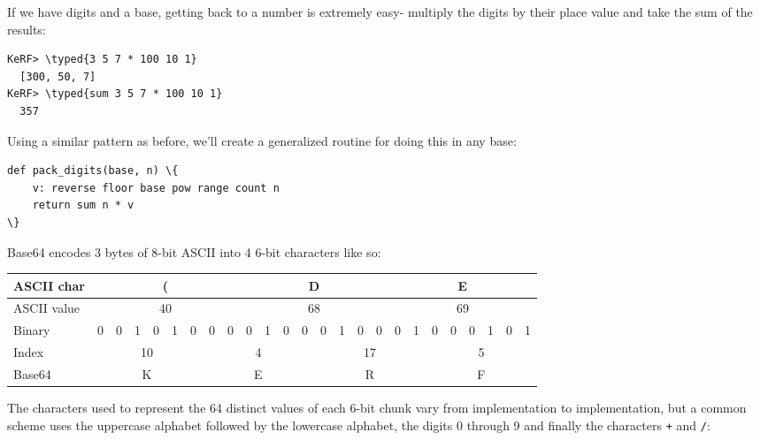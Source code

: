 \documentclass{article}
\newcommand{\typed}[1]{\textcolor{TealBlue}{#1}}
\begin{document}

If we have digits and a base, getting back to a number is extremely easy- multiply the digits by their place value and take the sum of the results:
\begin{Verbatim}
KeRF> \typed{3 5 7 * 100 10 1}
  [300, 50, 7]
KeRF> \typed{sum 3 5 7 * 100 10 1}
  357
\end{Verbatim}

Using a similar pattern as before, we'll create a generalized routine for doing this in any base:
\begin{Verbatim}
def pack_digits(base, n) \{
	v: reverse floor base pow range count n
	return sum n * v
\}
\end{Verbatim}

\pagebreak

Base64 encodes 3 bytes of 8-bit ASCII into 4 6-bit characters like so:
\begin{table}[h]
	\centering
	\begin{tabular}{| l |c|c|c|c|c|c|c|c|c|c|c|c|c|c|c|c|c|c|c|c|c|c|c|c|}
		\hline
			\cellcolor{tableHeaderColor} ASCII char &
			\multicolumn{8}{c|}{(} &
			\multicolumn{8}{c|}{D} &
			\multicolumn{8}{c|}{E} \\
		\hline
			\cellcolor{tableHeaderColor} ASCII value &
			\multicolumn{8}{c|}{40} &
			\multicolumn{8}{c|}{68} &
			\multicolumn{8}{c|}{69} \\
		\hline
			\cellcolor{tableHeaderColor} Binary &
			0&0&1&0&1&0&0&0&0&1&0&0&0&1&0&0&0&1&0&0&0&1&0&1\\
		\hline
			\cellcolor{tableHeaderColor} Index &
			\multicolumn{6}{c|}{10} &
			\multicolumn{6}{c|}{4}  &
			\multicolumn{6}{c|}{17} &
			\multicolumn{6}{c|}{5} \\
		\hline
			\cellcolor{tableHeaderColor} Base64 &
			\multicolumn{6}{c|}{K} &
			\multicolumn{6}{c|}{E} &
			\multicolumn{6}{c|}{R} &
			\multicolumn{6}{c|}{F} \\
		\hline
	\end{tabular}
\end{table}

The characters used to represent the 64 distinct values of each 6-bit chunk vary from implementation to implementation, but a common scheme uses the uppercase alphabet followed by the lowercase alphabet, the digits 0 through 9 and finally the characters \texttt{+} and \texttt{/}:
\end{document}
